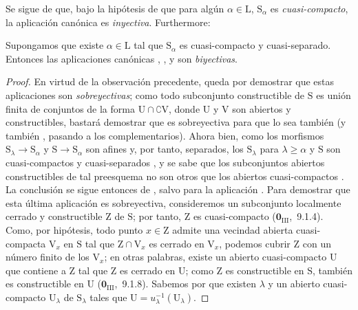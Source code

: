 Se sigue de  que, bajo la hipótesis de que para algún $\alpha\in\mathrm{L}$, $\mathrm{S}_\alpha$ es \emph{cuasi-compacto}, la aplicación canónica  es \emph{inyectiva}.
Furthermore:

\begin{theorem}[8.3.11]
\label{IV.8.3.11}
Supongamos que existe $\alpha\in\mathrm{L}$ tal que $\mathrm{S}_\alpha$ es cuasi-compacto y cuasi-separado.
Entonces las aplicaciones canónicas , ,  y  son \emph{biyectivas}.
\end{theorem}

\begin{proof}
En virtud de la observación precedente, queda por demostrar que estas aplicaciones son \emph{sobreyectivas}; como todo subconjunto constructible de $\mathrm{S}$ es unión finita de conjuntos de la forma $\mathrm{U}\cap\complement\mathrm{V}$, donde $\mathrm{U}$ y $\mathrm{V}$ son abiertos y constructibles, bastará demostrar que  es sobreyectiva para que lo sea también  (y también , pasando a los complementarios).
Ahora bien, como los morfismos $\mathrm{S}_\lambda\to\mathrm{S}_\alpha$ y $\mathrm{S}\to\mathrm{S}_\alpha$ son afines y, por tanto, separados, los $\mathrm{S}_\lambda$ para $\lambda\geqslant\alpha$ y $\mathrm{S}$ son cuasi-compactos y cuasi-separados , y se sabe que los subconjuntos abiertos constructibles de tal preesquema no son otros que los abiertos cuasi-compactos .
La conclusión se sigue entonces de , salvo para la aplicación .
Para demostrar que esta última aplicación es sobreyectiva, consideremos un subconjunto localmente cerrado y constructible $\mathrm{Z}$ de $\mathrm{S}$; por tanto, $\mathrm{Z}$ es cuasi-compacto ($\mathbf{0}_{\mathrm{III}}$,~9.1.4).
Como, por hipótesis, todo punto $x\in\mathrm{Z}$ admite una vecindad abierta cuasi-compacta $\mathrm{V}_x$ en $\mathrm{S}$ tal que $\mathrm{Z}\cap\mathrm{V}_x$ es cerrado en $\mathrm{V}_x$, podemos cubrir $\mathrm{Z}$ con un número finito de los $\mathrm{V}_x$; en otras palabras, existe un abierto cuasi-compacto $\mathrm{U}$ que contiene a $\mathrm{Z}$ tal que $\mathrm{Z}$ es cerrado en $\mathrm{U}$; como $\mathrm{Z}$ es constructible en $\mathrm{S}$, también es constructible en $\mathrm{U}$ ($\mathbf{0}_{\mathrm{III}}$,~9.1.8).
Sabemos por  que existen $\lambda$ y un abierto cuasi-compacto $\mathrm{U}_\lambda$ de $\mathrm{S}_\lambda$ tales que $\mathrm{U}=u_\lambda^{-1}(\mathrm{U}_\lambda)$.

\end{proof}
